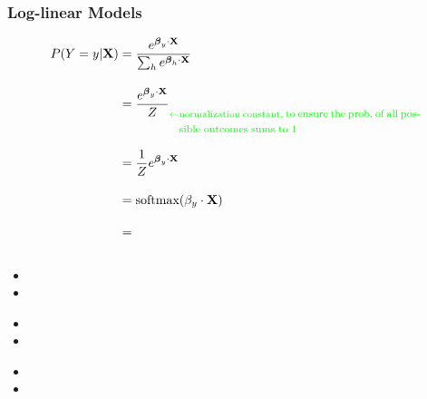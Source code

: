\documentclass[xcolor=pdftex,x11names,table,hyperref]{beamer}
\begin{document}
\begin{frame}[fragile]\frametitle{Log-linear Models}
	\begin{Large}
	\begin{align}
		P(Y = y | \mathbf{X}) & = \frac{e^{\boldsymbol\beta_y \cdot \mathbf{X}}}{\sum_h e^{\boldsymbol\beta_h \cdot \mathbf{X}}}  \nonumber\\[1.0em]
							  & = \frac{e^{\boldsymbol\beta_y \cdot \mathbf{X}}}{Z} _{\color{green}{ \leftarrow \text{\parbox[t]{0.55\textwidth}{ normalization constant, {\footnotesize to ensure the prob.\ of all possible outcomes sums to 1}}}}}  \nonumber\\[1.0em]
							 & = \frac{1}{Z} e^{\boldsymbol\beta_y \cdot \mathbf{X}}  \nonumber\\[1.0em]
							& = \text{softmax}(\beta_y \cdot \mathbf{X}) \nonumber\\[1.0em]
							& =  \nonumber\\[1.0em]
	\end{align}
	\end{Large}
\end{frame}

\begin{frame}{}
\begin{itemize}
	\item 
	\item 
\end{itemize}
\end{frame}

\begin{frame}{}
\begin{itemize}
	\item 
	\item 
\end{itemize}
\end{frame}

\begin{frame}{}
\begin{itemize}
	\item 
	\item 
\end{itemize}
\end{frame}





\end{document}
